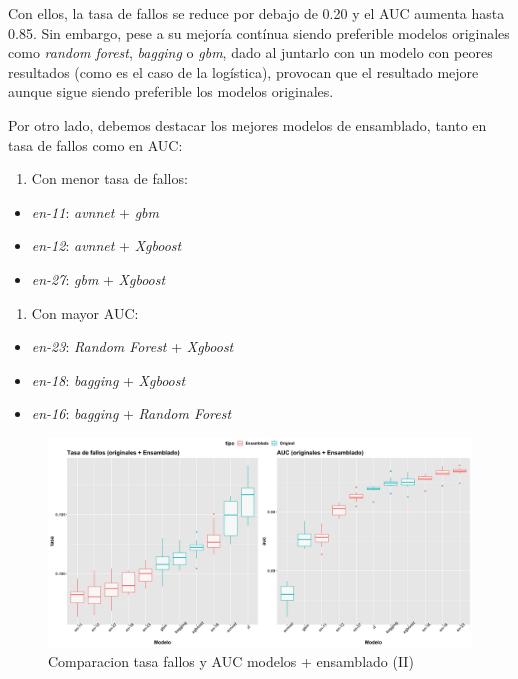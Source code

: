 \documentclass[
]{article}
\providecommand{\tightlist}{%
  \setlength{\itemsep}{0pt}\setlength{\parskip}{0pt}}
\begin{document}
Con ellos, la tasa de fallos se reduce por debajo de 0.20 y el AUC
aumenta hasta 0.85. Sin embargo, pese a su mejoría contínua siendo
preferible modelos originales como \emph{random forest}, \emph{bagging}
o \emph{gbm}, dado al juntarlo con un modelo con peores resultados (como
es el caso de la logística), provocan que el resultado mejore aunque
sigue siendo preferible los modelos originales.

Por otro lado, debemos destacar los mejores modelos de ensamblado, tanto
en tasa de fallos como en AUC:

\begin{enumerate}
\def\labelenumi{\arabic{enumi}.}
\tightlist
\item
  Con menor tasa de fallos:
\end{enumerate}

\begin{itemize}
\tightlist
\item
  \emph{en-11}: \emph{avnnet} + \emph{gbm}
\item
  \emph{en-12}: \emph{avnnet} + \emph{Xgboost}
\item
  \emph{en-27}: \emph{gbm} + \emph{Xgboost}
\end{itemize}

\begin{enumerate}
\def\labelenumi{\arabic{enumi}.}
\setcounter{enumi}{1}
\tightlist
\item
  Con mayor AUC:
\end{enumerate}

\begin{itemize}
\tightlist
\item
  \emph{en-23}: \emph{Random Forest} + \emph{Xgboost}
\item
  \emph{en-18}: \emph{bagging} + \emph{Xgboost}
\item
  \emph{en-16}: \emph{bagging} + \emph{Random Forest}
\end{itemize}

\begin{figure}[h!]

{\centering \includegraphics[width=0.99\linewidth,height=0.99\textheight,]{./charts/mejores_ensamblados_2modelos} 

}

\caption{Comparacion tasa fallos  y AUC modelos + ensamblado (II)}\label{fig:unnamed-chunk-144}
\end{figure}
\end{document}
